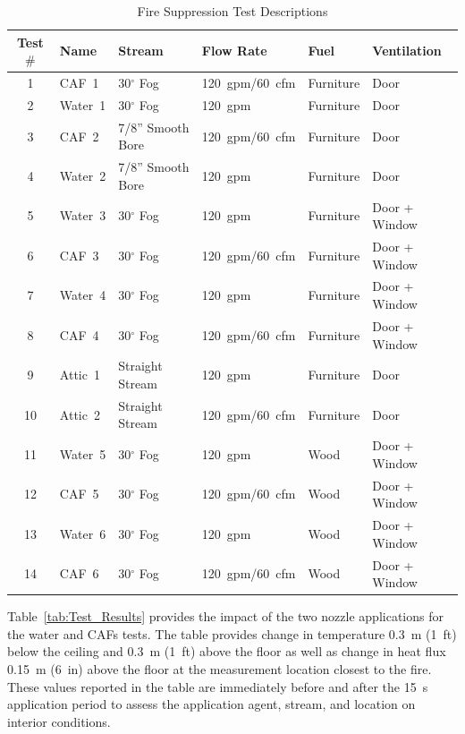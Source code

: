 \documentclass[12pt,oneside]{book}
\begin{document}
\begin{table}[!ht]
\centering
\caption{Fire Suppression Test Descriptions}\label{tab:Test_Descriptions}
\begin{tabular}{clllll}
\toprule[1.5pt]
Test $\#$  & Name	& Stream			& Flow Rate		& Fuel           & Ventilation     \\
\midrule
 1 & CAF~1    &  30$^{\circ}$ Fog  	&  120~gpm/60~cfm   & Furniture      & Door            \\
 2 & Water~1  &  30$^{\circ}$ Fog  	&  120~gpm    		& Furniture      & Door            \\
 3 & CAF~2 	  &  7/8'' Smooth Bore  	&  120~gpm/60~cfm   & Furniture      & Door            \\
 4 & Water~2  &  7/8'' Smooth Bore  	&  120~gpm    		& Furniture      & Door            \\
 5 & Water~3  &  30$^{\circ}$ Fog  	&  120~gpm    		& Furniture      & Door + Window   \\
 6 & CAF~3    &  30$^{\circ}$ Fog  	&  120~gpm/60~cfm   & Furniture      & Door + Window   \\
 7 & Water~4  &  30$^{\circ}$ Fog  	&  120~gpm    		& Furniture      & Door + Window   \\
 8 & CAF~4    &  30$^{\circ}$ Fog  	&  120~gpm/60~cfm   & Furniture      & Door + Window   \\
 9 & Attic~1  &  Straight Stream  	&  120~gpm    		& Furniture      & Door            \\
10 & Attic~2  &  Straight Stream  	&  120~gpm/60~cfm   & Furniture      & Door            \\
11 & Water~5  &  30$^{\circ}$ Fog  	&  120~gpm   		& Wood           & Door + Window   \\
12 & CAF~5    &  30$^{\circ}$ Fog  	&  120~gpm/60~cfm   & Wood           & Door + Window   \\
13 & Water~6  &  30$^{\circ}$ Fog  	&  120~gpm    		& Wood           & Door + Window   \\
14 & CAF~6    &  30$^{\circ}$ Fog  	&  120~gpm/60~cfm   & Wood           & Door + Window   \\
\bottomrule[1.25pt]
\end{tabular}\par
\end{table}

Table~\ref{tab:Test_Results} provides the impact of the two nozzle applications for the water and CAFs tests. The table provides change in temperature 0.3~m (1~ft) below the ceiling and 0.3~m (1~ft) above the floor as well as change in heat flux 0.15~m (6~in) above the floor at the measurement location closest to the fire. These values reported in the table are immediately before and after the 15~s application period to assess the application agent, stream, and location on interior conditions.
\end{document}
